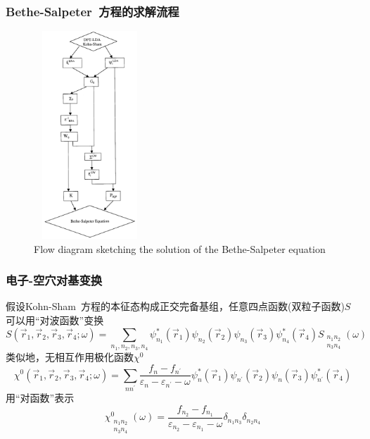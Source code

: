 \documentclass[cjk,slidestop,compress,mathserif,blue]{beamer}
\begin{document}
\frame
{
	\frametitle{\textrm{Bethe-Salpeter~}方程的求解流程}
\begin{figure}[h!]
\centering
\vspace*{-0.26in}
\includegraphics[height=3.07in,width=1.65in,viewport=0 0 380 850,clip]{Figures/BSE_flow.png}
\caption{\small \textrm{Flow diagram sketching the solution of the Bethe-Salpeter equation}}%
\label{BS_equation-1}
\end{figure} 
}

\frame
{
	\frametitle{电子-空穴对基变换}
	假设\textrm{Kohn-Sham~}方程的本征态构成正交完备基组，任意四点函数(双粒子函数)$S$可以用“对波函数”变换
	\begin{displaymath}
		S(\vec r_1,\vec r_2,\vec r_3,\vec r_4;\omega)=\sum_{n_1,n_2,n_3,n_4}\psi_{n_1}^{\ast}(\vec r_1)\psi_{n_2}(\vec r_2)\psi_{n_3}(\vec r_3)\psi_{n_4}^{\ast}(\vec r_4)S_{\substack{n_1 n_2\\n_3 n_4 }}(\omega)
	\end{displaymath}
	类似地，无相互作用极化函数$\chi^0$
	\begin{displaymath}
		\chi^0(\vec r_1,\vec r_2,\vec r_3,\vec r_4;\omega)=\sum_{nn^{\prime}}\frac{f_n-f_{n^{\prime}}}{\varepsilon_n-\varepsilon_{n^{\prime}}-\omega}\psi_n^{\ast}(\vec r_1)\psi_{n^{\prime}}(\vec r_2)\psi_n(\vec r_3)\psi_{n^{\prime}}^{\ast}(\vec r_4)
	\end{displaymath}
用“对函数”表示
\begin{displaymath}
	\chi_{ \substack {n_1 n_2\\n_3 n_4}  }^0
		(\omega)=\frac{f_{n_2}-f_{n_1}}{\varepsilon_{n_2}-\varepsilon_{n_1}-\omega}\delta_{n_1n_3}\delta_{n_2n_4}
\end{displaymath}
}
\end{document}
